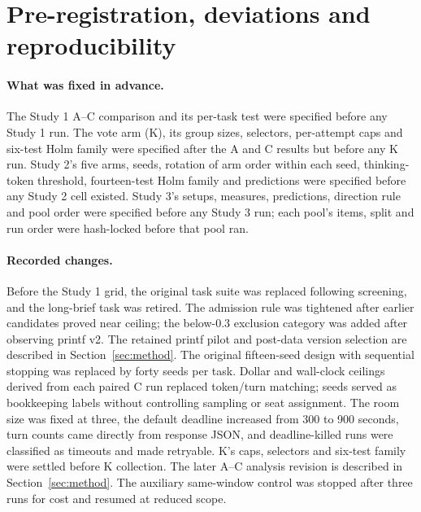 \section{Pre-registration, deviations and reproducibility}
\label{sec:reproducibility}

\paragraph{What was fixed in advance.} The Study 1 A--C comparison and its per-task test were specified before any Study 1 run. The vote arm (K), its group sizes, selectors, per-attempt caps and six-test Holm family were specified after the A and C results but before any K run. Study 2's five arms, seeds, rotation of arm order within each seed, thinking-token threshold, fourteen-test Holm family and predictions were specified before any Study 2 cell existed. Study 3's setups, measures, predictions, direction rule and pool order were specified before any Study 3 run; each pool's items, split and run order were hash-locked before that pool ran.

\paragraph{Recorded changes.} Before the Study 1 grid, the original task suite was replaced following screening, and the long-brief task was retired. The admission rule was tightened after earlier candidates proved near ceiling; the below-0.3 exclusion category was added after observing printf v2. The retained printf pilot and post-data version selection are described in Section~\ref{sec:method}. The original fifteen-seed design with sequential stopping was replaced by forty seeds per task. Dollar and wall-clock ceilings derived from each paired C run replaced token/turn matching; seeds served as bookkeeping labels without controlling sampling or seat assignment. The room size was fixed at three, the default deadline increased from 300 to 900 seconds, turn counts came directly from response JSON, and deadline-killed runs were classified as timeouts and made retryable. K's caps, selectors and six-test family were settled before K collection. The later A--C analysis revision is described in Section~\ref{sec:method}. The auxiliary same-window control was stopped after three runs for cost and resumed at reduced scope.

